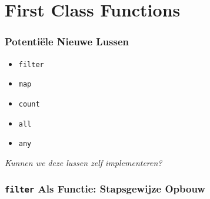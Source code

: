 \section{First Class Functions}

\frame{\tableofcontents[currentsection]}

\begin{frame}
  \frametitle{Potenti\"ele Nieuwe Lussen}
  \begin{itemize}
    \item \texttt{filter}
    \item \texttt{map}
    \item \texttt{count}
    \item \texttt{all}
    \item \texttt{any}
  \end{itemize}
  \begin{center} \itshape
    Kunnen we  deze lussen zelf implementeren?
  \end{center}
\end{frame}

\begin{frame}
  \frametitle{\texttt{filter} Als Functie: Stapsgewijze Opbouw}
  \begin{overprint}


  \end{overprint}
\end{frame}

